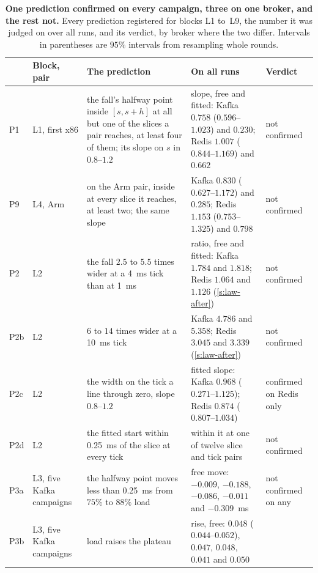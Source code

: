 \documentclass[10pt,journal,onecolumn]{IEEEtran}
\newcommand{\kafka}{Kafka}
\newcommand{\redis}{Redis}
\begin{document}
\begin{table}[htbp]
\caption{\textbf{One prediction confirmed on every campaign, three on one broker, and the rest
not.} Every prediction registered for blocks L1 to~L9, the number it was judged on over all runs,
and its verdict, by broker where the two differ. Intervals in parentheses are $95\%$ intervals from
resampling whole rounds.}
\label{stab:lawverdicts}
\centering
\footnotesize
\begin{tabular}{@{}p{0.9cm}p{1.9cm}p{4.6cm}p{6.6cm}p{1.9cm}@{}}
\toprule
& Block, pair & The prediction & On all runs & Verdict\\
\midrule
P1 & \raggedright L1, first x86 & \raggedright the fall's halfway point inside $[s, s + h]$ at
all but one of the slices a pair reaches, at least four of them; its slope on $s$ in
$0.8$--$1.2$ & \raggedright slope, free and fitted: \kafka{}
$0.758$ ($0.596$--$1.023$) and $0.230$; \redis{} $1.007$ ($0.844$--$1.169$) and $0.662$ &
\raggedright not confirmed\tabularnewline
P9 & \raggedright L4, Arm & \raggedright on the Arm pair, inside at every slice it reaches, at
least two; the same slope &
\raggedright \kafka{} $0.830$ ($0.627$--$1.172$) and $0.285$; \redis{} $1.153$
($0.753$--$1.325$) and $0.798$ & \raggedright not confirmed\tabularnewline
P2 & \raggedright L2 & \raggedright the fall $2.5$ to $5.5$ times wider at a 4~ms tick than at
1~ms & \raggedright ratio, free and fitted: \kafka{} $1.784$ and $1.818$; \redis{} $1.064$ and
$1.126$ (\ref{s:law-after}) & \raggedright not confirmed\tabularnewline
P2b & \raggedright L2 & \raggedright $6$ to $14$ times wider at a 10~ms tick & \raggedright
\kafka{} $4.786$ and $5.358$; \redis{} $3.045$ and $3.339$ (\ref{s:law-after}) & \raggedright
not confirmed\tabularnewline
P2c & \raggedright L2 & \raggedright the width on the tick a line through zero, slope
$0.8$--$1.2$ & \raggedright fitted slope: \kafka{} $0.968$ ($0.271$--$1.125$); \redis{} $0.874$
($0.807$--$1.034$) & \raggedright confirmed on \redis{} only\tabularnewline
P2d & \raggedright L2 & \raggedright the fitted start within 0.25~ms of the slice at every tick
& \raggedright within it at one of twelve slice and tick pairs & \raggedright not
confirmed\tabularnewline
P3a & \raggedright L3, five \kafka{} campaigns & \raggedright the halfway point moves less than
0.25~ms from $75\%$ to $88\%$ load & \raggedright free move: $-0.009$, $-0.188$, $-0.086$,
$-0.011$ and $-0.309$~ms & \raggedright not confirmed on any\tabularnewline
P3b & \raggedright L3, five \kafka{} campaigns & \raggedright load raises the plateau &
\raggedright rise, free: $0.048$ ($0.044$--$0.052$), $0.047$, $0.048$, $0.041$ and $0.050$ &

\end{tabular}
\end{table}
\end{document}

